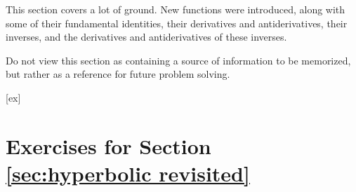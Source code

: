 




This section covers a lot of ground. New functions were introduced, along with some of their fundamental identities, their derivatives and antiderivatives, their inverses, and the derivatives and antiderivatives of these inverses. 

Do not view this section as containing a source of information to be memorized, but rather as a reference for future problem solving. 

%

[ex]
\section*{Exercises for Section \ref{sec:hyperbolic revisited}}


